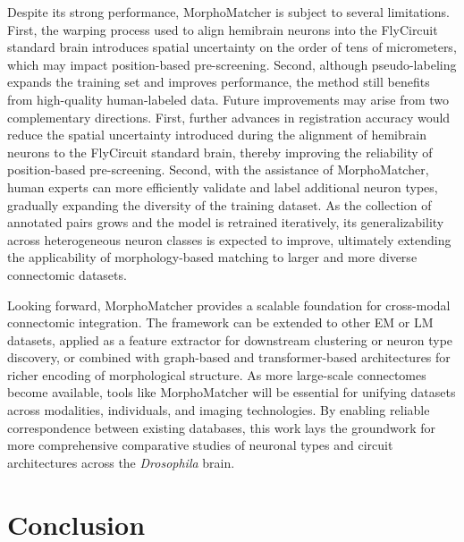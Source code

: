\documentclass[10pt,a4paper]{article}
\begin{document}
Despite its strong performance, MorphoMatcher is subject to several limitations.
First, the warping process used to align hemibrain neurons into the FlyCircuit
standard brain introduces spatial uncertainty on the order of tens of
micrometers, which may impact position-based pre-screening. Second, although
pseudo-labeling expands the training set and improves performance, the method
still benefits from high-quality human-labeled data.
Future improvements may
arise from two complementary directions. First, further advances in registration
accuracy would reduce the spatial uncertainty introduced during the alignment of
hemibrain neurons to the FlyCircuit standard brain, thereby improving the
reliability of position-based pre-screening. Second, with the assistance of
MorphoMatcher, human experts can more efficiently validate and label additional
neuron types, gradually expanding the diversity of the training dataset. As the
collection of annotated pairs grows and the model is retrained iteratively, its
generalizability across heterogeneous neuron classes is expected to improve,
ultimately extending the applicability of morphology-based matching to larger
and more diverse connectomic datasets.

Looking forward, MorphoMatcher provides a scalable foundation for cross-modal
connectomic integration. The framework can be extended to other EM or LM
datasets, applied as a feature extractor for downstream clustering or neuron
type discovery, or combined with graph-based and transformer-based architectures
for richer encoding of morphological structure. As more large-scale connectomes
become available, tools like MorphoMatcher will be essential for unifying
datasets across modalities, individuals, and imaging technologies. By enabling
reliable correspondence between existing databases, this work lays the
groundwork for more comprehensive comparative studies of neuronal types and
circuit architectures across the \textit{Drosophila} brain.

\section{Conclusion}
\end{document}
